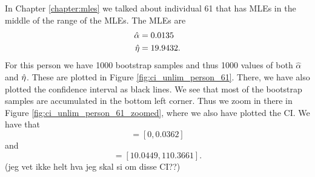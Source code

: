 In Chapter \ref{chapter:mles} we talked about individual 61 that has MLEs in the middle of the range of the MLEs. The MLEs are
\begin{equation*}
    \begin{aligned}
        \hat{\alpha} &= 0.0135\\
        \hat{\eta} &= 19.9432.
    \end{aligned}
\end{equation*}
For this person we have 1000 bootstrap samples and thus 1000 values of both $\hat{\alpha}$ and $\hat{\eta}$. These are plotted in Figure \ref{fig:ci_unlim_person_61}. There, we have also plotted the confidence interval as black lines. We see that most of the bootstrap samples are accumulated in the bottom left corner. Thus we zoom in there in Figure \ref{fig:ci_unlim_person_61_zoomed}, where we also have plotted the CI. We have that
\begin{equation*}
    [\hat{\alpha}^{*(5)}_{1000},\hat{\alpha}^{*(95)}_{1000}] = [0,0.0362]
\end{equation*}
and
\begin{equation*}
    [\hat{\eta}^{*(5)}_{1000},\hat{\eta}^{*(95)}_{1000}] = [10.0449,110.3661].
\end{equation*}
(jeg vet ikke helt hva jeg skal si om disse CI??)

